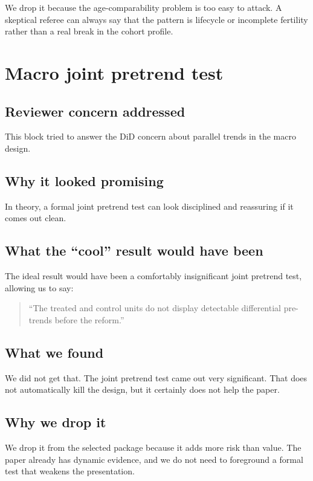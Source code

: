 \documentclass[11pt]{article}
\begin{document}
We drop it because the age-comparability problem is too easy to attack. A skeptical referee can always say that the pattern is lifecycle or incomplete fertility rather than a real break in the cohort profile.

\section{Macro joint pretrend test}

\subsection*{Reviewer concern addressed}

This block tried to answer the DiD concern about parallel trends in the macro design.

\subsection*{Why it looked promising}

In theory, a formal joint pretrend test can look disciplined and reassuring if it comes out clean.

\subsection*{What the ``cool'' result would have been}

The ideal result would have been a comfortably insignificant joint pretrend test, allowing us to say:
\begin{quote}
``The treated and control units do not display detectable differential pre-trends before the reform.''
\end{quote}

\subsection*{What we found}

We did not get that. The joint pretrend test came out very significant. That does not automatically kill the design, but it certainly does not help the paper.

\subsection*{Why we drop it}

We drop it from the selected package because it adds more risk than value. The paper already has dynamic evidence, and we do not need to foreground a formal test that weakens the presentation.
\end{document}
